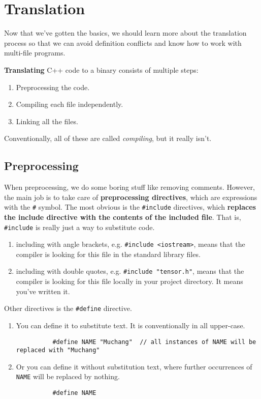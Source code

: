 \documentclass{article}
\begin{document}
\section{Translation} 

    Now that we've gotten the basics, we should learn more about the translation process so that we can avoid definition conflicts and know how to work with multi-file programs. 

    \begin{definition}[Translation]
      \textbf{Translating} C++ code to a binary consists of multiple steps: 
      \begin{enumerate}
        \item Preprocessing the code. 
        \item Compiling each file independently. 
        \item Linking all the files. 
      \end{enumerate}
      Conventionally, all of these are called \textit{compiling}, but it really isn't. 
    \end{definition}

  \subsection{Preprocessing} 

    When preprocessing, we do some boring stuff like removing comments. However, the main job is to take care of \textbf{preprocessing directives}, which are expressions with the \texttt{\#} symbol. The most obvious is the \texttt{\#include} directives, which \textbf{replaces the include directive with the contents of the included file}. That is, \texttt{\#include} is really just a way to substitute code.  
    \begin{enumerate}
      \item including with angle brackets, e.g. \texttt{\#include <iostream>}, means that the compiler is looking for this file in the standard library files. 
      \item including with double quotes, e.g. \texttt{\#include "tensor.h"}, means that the compiler is looking for this file locally in your project directory. It means you've written it. 
    \end{enumerate}
    
    Other directives is the \texttt{\#define} directive. 
    \begin{enumerate}
      \item You can define it to substitute text. It is conventionally in all upper-case.  
        \begin{lstlisting}
          #define NAME "Muchang"  // all instances of NAME will be replaced with "Muchang"
        \end{lstlisting}
      \item Or you can define it without substitution text, where further occurrences of \texttt{NAME} will be replaced by nothing. 
        \begin{lstlisting}
          #define NAME 
        \end{lstlisting}
    \end{enumerate}
\end{document}
